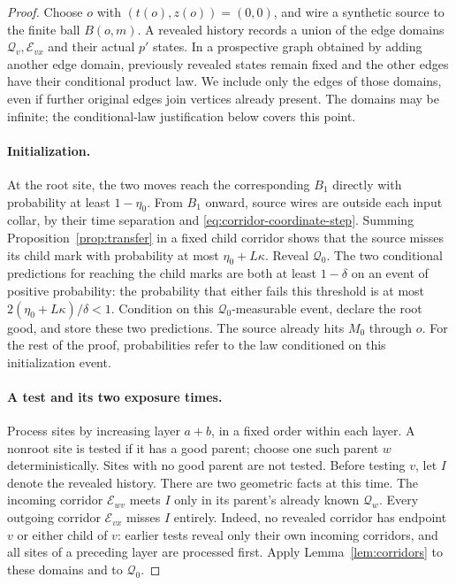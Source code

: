 \documentclass[11pt]{article}
\theoremstyle{definition}
\begin{document}
\begin{proof}
Choose $o$ with $(t(o),z(o))=(0,0)$, and wire a synthetic source to
the finite ball $B(o,m)$. A revealed history
records a union of the edge domains $\mathcal Q_v,\mathcal E_{vx}$
and their actual $p'$ states. In a prospective graph obtained by adding
another edge domain, previously revealed states remain fixed and the
other edges have their conditional product law. We include only the
edges of those domains, even if further original edges join vertices
already present. The domains may be infinite; the conditional-law
justification below covers this point.

\paragraph{Initialization.}
At the root site, the two moves reach the corresponding $B_1$ directly
with probability at least $1-\eta_0$. From $B_1$ onward, source wires
are outside each input collar, by their time separation and
\eqref{eq:corridor-coordinate-step}. Summing
Proposition~\ref{prop:transfer} in a fixed child corridor shows that
the source misses its child mark with probability at most
$\eta_0+L\kappa$. Reveal $\mathcal Q_0$. The two conditional
predictions for reaching the child marks are both at least
$1-\delta$ on an event of positive probability: the probability
that either fails this threshold is at most
$2(\eta_0+L\kappa)/\delta<1$. Condition on this
$\mathcal Q_0$-measurable event, declare the root good, and store
these two predictions. The source already hits $M_0$ through $o$.
For the rest of the proof, probabilities refer to the law conditioned
on this initialization event.

\paragraph{A test and its two exposure times.}
Process sites by increasing layer $a+b$, in a fixed order within
each layer. A nonroot site is tested if it has a good parent; choose
one such parent $w$ deterministically. Sites with no good parent are
not tested. Before testing $v$, let $I$ denote the revealed history.
There are two geometric facts at this time. The incoming corridor
$\mathcal E_{wv}$ meets $I$ only in its parent's already known
$\mathcal Q_w$. Every outgoing corridor $\mathcal E_{vx}$ misses $I$
entirely. Indeed, no revealed corridor has endpoint $v$ or either child
of $v$: earlier tests reveal only their own incoming corridors, and
all sites of a preceding layer are processed first. Apply
Lemma~\ref{lem:corridors} to these domains and to $\mathcal Q_0$.


\end{proof}
\end{document}
